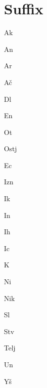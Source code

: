 \section{Suffix}


Ak

An

Ar

Ač

Dl

En

Ot

Ostj

Ec

Izn

Ik

In

Ih

Ic

K

Ni

Nik

Sl

Stv

Telj

Un

Yš
